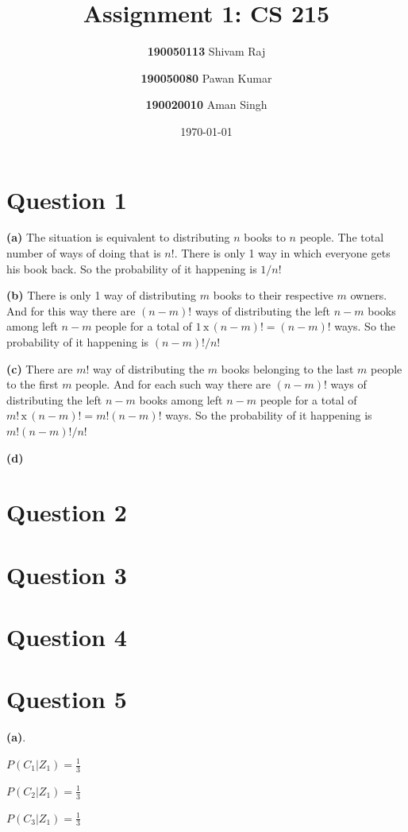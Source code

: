 \documentclass{article}
\title{Assignment 1: CS 215}
\author{
  \textbf{190050113} Shivam Raj
  \and
  \textbf{190050080} Pawan Kumar
  \and
  \textbf{190020010} Aman Singh
}
\date{\today}
\theoremstyle{remark}
\begin{document}
\maketitle
\tableofcontents

\newpage
{}

\section{Question 1}
\textbf{(a)} The situation is equivalent to distributing $n$ books to $n$ people. The total number of ways of doing that is $n!$. There is only 1 way in which everyone gets his book back. So the probability of it happening is $\boxed{1/n!}$ \par

\textbf{(b)} There is only 1 way of distributing $m$ books to their respective $m$ owners. And for this way there are $(n-m)!$ ways of distributing the left $n-m$ books among left $n-m$ people for a total of $1\,\text{x}\,(n-m)!=(n-m)!$ ways. So the probability of it happening is $\boxed{(n-m)!/n!}$ \par

\textbf{(c)} There are $m!$ way of distributing the $m$ books belonging to the last $m$ people to the first $m$ people. And for each such way there are $(n-m)!$ ways of distributing the left $n-m$ books among left $n-m$ people for a total of $m!\,\text{x}\,(n-m)!=m!(n-m)!$ ways. So the probability of it happening is $\boxed{m!(n-m)!/n!}$ \par

\textbf{(d)}

\section{Question 2}
\section{Question 3}
\section{Question 4}
\section{Question 5}
\hspace{2.5em} \textbf{(a)}.
\begin{center}
    \hspace{1.25em}$P(C_1|Z_1)= \frac{1}{3}$ \par
    \hspace{1.25em}$P(C_2|Z_1)=\frac{1}{3}$ \par
    \hspace{1.25em}$P(C_3|Z_1)=\frac{1}{3}$ \par
\end{center}
\end{document}
